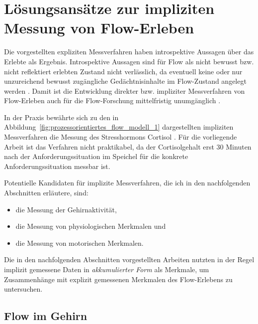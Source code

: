 

\section{Lösungsansätze zur impliziten Messung von Flow-Erleben} 

\label{sec:losungsansatze_zur_impliziten_messung_von_flow_erleben}

Die vorgestellten expliziten Messverfahren haben introspektive Aussagen über das Erlebte als Ergebnis. Introspektive Aussagen sind für Flow als nicht bewusst bzw. nicht reflektiert erlebten Zustand nicht verlässlich, da eventuell keine oder nur unzureichend bewusst zugängliche Gedächtnisinhalte im Flow-Zustand angelegt werden \citep[][S.~82]{Henk2014}. Damit ist die Entwicklung direkter bzw. impliziter Messverfahren von Flow-Erleben auch für die Flow-Forschung mittelfristig unumgänglich \citep[][S.~86]{Henk2014}.

In der Praxis bewährte sich zu den in Abbildung~\ref{fig:prozessorientiertes_flow_modell_1} dargestellten impliziten Messverfahren die Messung des Stresshormons Cortisol \citep{Keller2011, Peifer2014, Peifer2015}. Für die vorliegende Arbeit ist das Verfahren nicht praktikabel, da der Cortisolgehalt erst 30 Minuten nach der Anforderungssituation im Speichel für die konkrete Anforderungssituation messbar ist. 

Potentielle Kandidaten für implizite Messverfahren, die ich in den nachfolgenden Abschnitten erläutere, sind: 
\begin{itemize}
	
	\item die Messung der Gehirnaktivität,
	
	\item die Messung von physiologischen Merkmalen und
	
	\item die Messung von motorischen Merkmalen. 
\end{itemize}

Die in den nachfolgenden Abschnitten vorgestellten Arbeiten nutzten in der Regel implizit gemessene Daten in \emph{akkumulierter Form} als Merkmale, um Zusammenhänge mit explizit gemessenen Merkmalen des Flow-Erlebens zu untersuchen.

\subsection{Flow im Gehirn} 

